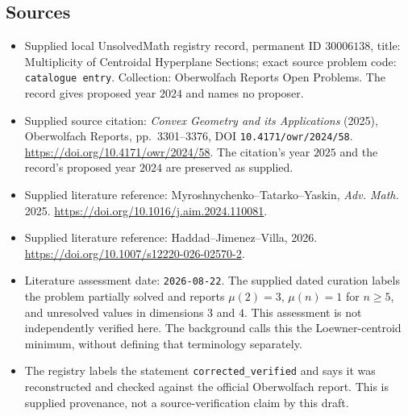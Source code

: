 \documentclass[11pt]{article}
\begin{document}
\subsection{Sources}
\begin{itemize}
\item Supplied local UnsolvedMath registry record, permanent ID \(30006138\), title: Multiplicity of Centroidal Hyperplane Sections; exact source problem code: \texttt{catalogue entry}. Collection: Oberwolfach Reports Open Problems. The record gives proposed year \(2024\) and names no proposer.
\item Supplied source citation: \emph{Convex Geometry and its Applications} (2025), Oberwolfach Reports, pp.\ 3301--3376, DOI \texttt{10.4171/owr/2024/58}. \url{https://doi.org/10.4171/owr/2024/58}. The citation's year \(2025\) and the record's proposed year \(2024\) are preserved as supplied.
\item Supplied literature reference: Myroshnychenko--Tatarko--Yaskin, \emph{Adv. Math.} 2025. \url{https://doi.org/10.1016/j.aim.2024.110081}.
\item Supplied literature reference: Haddad--Jimenez--Villa, 2026. \url{https://doi.org/10.1007/s12220-026-02570-2}.
\item Literature assessment date: \texttt{2026-08-22}. The supplied dated curation labels the problem partially solved and reports \(\mu(2)=3\), \(\mu(n)=1\) for \(n\geq5\), and unresolved values in dimensions \(3\) and \(4\). This assessment is not independently verified here. The background calls this the Loewner-centroid minimum, without defining that terminology separately.
\item The registry labels the statement \texttt{corrected\_verified} and says it was reconstructed and checked against the official Oberwolfach report. This is supplied provenance, not a source-verification claim by this draft.
\end{itemize}
\end{document}

